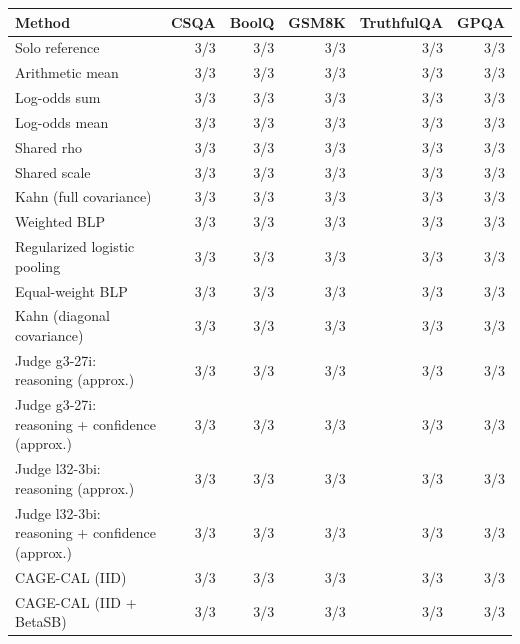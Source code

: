 \begin{tabular}{lrrrrr}
\toprule
Method & CSQA & BoolQ & GSM8K & TruthfulQA & GPQA \\
\midrule
Solo reference & 3/3 & 3/3 & 3/3 & 3/3 & 3/3 \\
Arithmetic mean & 3/3 & 3/3 & 3/3 & 3/3 & 3/3 \\
Log-odds sum & 3/3 & 3/3 & 3/3 & 3/3 & 3/3 \\
Log-odds mean & 3/3 & 3/3 & 3/3 & 3/3 & 3/3 \\
Shared rho & 3/3 & 3/3 & 3/3 & 3/3 & 3/3 \\
Shared scale & 3/3 & 3/3 & 3/3 & 3/3 & 3/3 \\
Kahn (full covariance) & 3/3 & 3/3 & 3/3 & 3/3 & 3/3 \\
Weighted BLP & 3/3 & 3/3 & 3/3 & 3/3 & 3/3 \\
Regularized logistic pooling & 3/3 & 3/3 & 3/3 & 3/3 & 3/3 \\
Equal-weight BLP & 3/3 & 3/3 & 3/3 & 3/3 & 3/3 \\
Kahn (diagonal covariance) & 3/3 & 3/3 & 3/3 & 3/3 & 3/3 \\
Judge g3-27i: reasoning (approx.) & 3/3 & 3/3 & 3/3 & 3/3 & 3/3 \\
Judge g3-27i: reasoning + confidence (approx.) & 3/3 & 3/3 & 3/3 & 3/3 & 3/3 \\
Judge l32-3bi: reasoning (approx.) & 3/3 & 3/3 & 3/3 & 3/3 & 3/3 \\
Judge l32-3bi: reasoning + confidence (approx.) & 3/3 & 3/3 & 3/3 & 3/3 & 3/3 \\
CAGE-CAL (IID) & 3/3 & 3/3 & 3/3 & 3/3 & 3/3 \\
CAGE-CAL (IID + BetaSB) & 3/3 & 3/3 & 3/3 & 3/3 & 3/3 \\
\bottomrule
\end{tabular}
